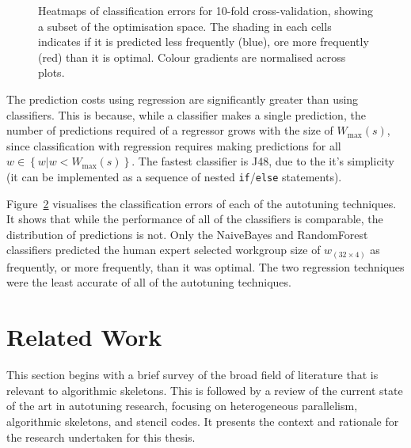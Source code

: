 \documentclass[nonatbib,preprint,10pt]{sigplanconf}
\begin{document}
\begin{figure}
\begin{subfigure}[t]{0.48\columnwidth}
\vspace{-1.5em} %
\caption{}
\label{fig:class-hmaps-6}
\end{subfigure}
\caption[Classification error heatmaps]{%
  Heatmaps of classification errors for 10-fold cross-validation,
  showing a subset of the optimisation space. The shading in each
  cells indicates if it is predicted less frequently (blue), ore more
  frequently (red) than it is optimal. Colour gradients are normalised
  across plots.%
}
\label{fig:class-hmaps}
\end{figure}


The prediction costs using regression are significantly greater than
using classifiers. This is because, while a classifier makes a single
prediction, the number of predictions required of a regressor grows
with the size of $W_{\max}(s)$, since classification with regression
requires making predictions for all
$w \in \left\{ w | w < W_{\max}(s) \right\}$. The fastest classifier
is J48, due to the it's simplicity (it can be implemented as a
sequence of nested \texttt{if}/\texttt{else} statements).

Figure~\ref{fig:class-hmaps} visualises the classification errors of
each of the autotuning techniques. It shows that while the performance
of all of the classifiers is comparable, the distribution of
predictions is not. Only the NaiveBayes and RandomForest classifiers
predicted the human expert selected workgroup size of
$w_{(32 \times 4)}$ as frequently, or more frequently, than it was
optimal. The two regression techniques were the least accurate of all
of the autotuning techniques.


\section{Related Work}\label{sec:related}

This section begins with a brief survey of the broad field of
literature that is relevant to algorithmic skeletons. This is followed
by a review of the current state of the art in autotuning research,
focusing on heterogeneous parallelism, algorithmic skeletons, and
stencil codes. It presents the context and rationale for the research
undertaken for this thesis.



\end{document}
